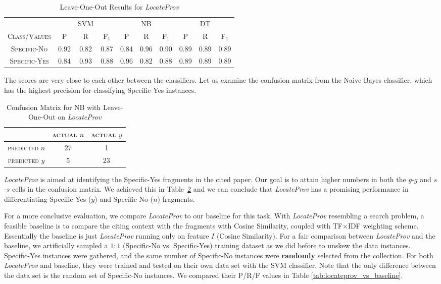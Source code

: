 \begin{table}[h]
	\center
	\begin{tabular}{ c | c  c  c | c c c | c c c}
		& & SVM & & & NB & & & DT \\
		\textsc{Class/Values} & \textsc{P} & \textsc{R} & \textsc{F$_1$} & \textsc{P} & \textsc{R} & \textsc{F$_1$} & \textsc{P} & \textsc{R} & \textsc{F$_1$} \\
		\hline
		\textsc{Specific-No} 			& 0.92  &    0.82   &   0.87 & 0.84   &   0.96   &   0.90 & 0.89  &    0.89  &    0.89 \\
		\textsc{Specific-Yes} 			& 0.84  &    0.93   &   0.88 & 0.96   &   0.82   &   0.88 & 0.89  &    0.89  &    0.89 \\
	\end{tabular}
	\caption{Leave-One-Out Results for {\it LocateProv}}
	\label{tab:secondtieresults}
\end{table}
The scores are very close to each other between the classifiers. Let us examine the confusion matrix from the Naive Bayes classifier, which has the highest precision for classifying Specific-Yes instances.

\begin{table}[h]
	\center
	\begin{tabular}{ c | c  c }
		 & \textsc{actual $n$} & \textsc{actual $y$} \\
		\hline
		\textsc{predicted $n$} 	& 27 & 1 \\
		\textsc{predicted $y$}		& 5 & 23
	\end{tabular}
	\caption{Confusion Matrix for NB with Leave-One-Out on {\it LocateProv}}
	\label{tab:secondnbconfusionmatrix}
\end{table}
\textit{LocateProv} is aimed at identifying the Specific-Yes fragments in the cited paper. Our goal is to attain higher numbers in both the $g$-$g$ and $s$-$s$ cells in the confusion matrix. We achieved this in Table~\ref{tab:secondnbconfusionmatrix} and we can conclude that \textit{LocateProv} has a promising performance in differentiating Specific-Yes ($y$) and Specific-No ($n$) fragments.

For a more conclusive evaluation, we compare \textit{LocateProv} to our baseline for this task. With \textit{LocateProv} resembling a search problem, a feasible baseline is to compare the citing context with the fragments with Cosine Similarity, coupled with TF$\times$IDF \cite{irtextbook} weighting scheme. Essentially the baseline is just \textit{LocateProv} running only on feature $I$ (Cosine Similarity). For a fair comparison between \textit{LocateProv} and the baseline, we artificially sampled a $1:1$ (Specific-No vs. Specific-Yes) training dataset as we did before to unskew the data instances. Specific-Yes instances were gathered, and the same number of Specific-No instances were \textbf{randomly} selected from the collection. For both \textit{LocateProv} and baseline, they were trained and tested on their own data set with the SVM classifier. Note that the only difference between the data set is the random set of Specific-No instances. We compared their P/R/F values in Table \ref{tab:locateprov_vs_baseline}.

